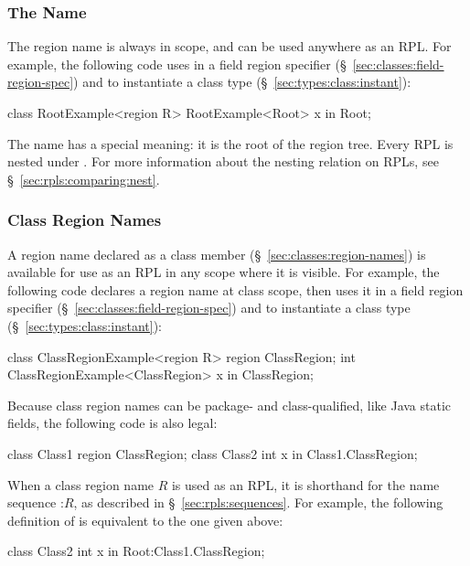 \subsubsection{The Name %
\label{sec:rpls:basic:root}}

The region name  is always in scope, and can be used
anywhere as an RPL.  For example, the following code uses 
in a field region specifier (\S~\ref{sec:classes:field-region-spec})
and to instantiate a class type (\S~\ref{sec:types:class:instant}):
%
\begin{dpjlisting}
class RootExample<region R> {
  RootExample<Root> x in Root;
}
\end{dpjlisting}
%

The name  has a special meaning: it is the root of the
region tree.  Every RPL is nested under .  For more
information about the nesting relation on RPLs, see
\S~\ref{sec:rpls:comparing:nest}.

\subsubsection{Class Region Names%
\label{sec:rpls:basic:class}}

A region name declared as a class member
(\S~\ref{sec:classes:region-names}) is available for use as an RPL in
any scope where it is visible.  For example, the following code
declares a region name  at class scope, then uses it
in a field region specifier (\S~\ref{sec:classes:field-region-spec})
and to instantiate a class type (\S~\ref{sec:types:class:instant}):
%
\begin{dpjlisting}
class ClassRegionExample<region R> {
  region ClassRegion;
  int ClassRegionExample<ClassRegion> x in ClassRegion;
}
\end{dpjlisting}
%
Because class region names can be package- and class-qualified, like
Java static fields, the following code is also legal:
%
\begin{dpjlisting}
class Class1 {
  region ClassRegion;
}
class Class2 {
  int x in Class1.ClassRegion;
}
\end{dpjlisting}

When a class region name $R$ is used as an RPL, it is shorthand for
the name sequence :$R$, as described in
\S~\ref{sec:rpls:sequences}.  For example, the following definition of
 is equivalent to the one given above:
%
\begin{dpjlisting}
class Class2 {
  int x in Root:Class1.ClassRegion;
}
\end{dpjlisting}


